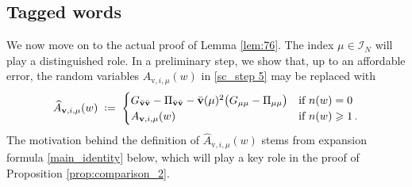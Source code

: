 \documentclass[11pt]{article} %
\numberwithin{equation}{section}
\numberwithin{figure}{section}
\theoremstyle{plain} %
\theoremstyle{definition} %
\newcommand{\f}[1]{\boldsymbol{\mathrm{#1}}} %
\renewcommand{\cal}{\mathcal}
\newcommand{\wh}{\widehat}
\newcommand*{\deq}{\mathrel{\vcenter{\baselineskip0.65ex \lineskiplimit0pt \hbox{.}\hbox{.}}}=}
\renewcommand{\geq}{\geqslant}
\newcommand{\pb}[1]{\bigl({#1}\bigr)}
\begin{document}
\subsection{Tagged words}
We now move on to the actual proof of Lemma \ref{lem:76}. The index $\mu \in \cal I_N$ will play a distinguished role.
In a preliminary step, we show that, up to an affordable error, the random variables $A_{\f v,i,\mu}(w)$ in \eqref{sc_step 5} may be replaced with
\begin{equation*}
\wh A_{\f v,i,\mu}(w) \;\deq\;
\begin{cases}
G_{\bar {\f v} \bar {\f v}} - \Pi_{\bar {\f v} \bar {\f v}} - \bar {\f v}(\mu)^2 \pb{G_{\mu \mu} - \Pi_{\mu \mu}} & \text{if } n(w) = 0
\\
A_{\f v,i,\mu}(w) & \text{if } n(w) \geq 1\,.
\end{cases}
\end{equation*}
The motivation behind the definition of $\wh A_{\f v,i,\mu}(w)$ stems from expansion formula \eqref{main_identity} below, which will play a key role in the proof of Proposition \ref{prop:comparison_2}.
\end{document}
